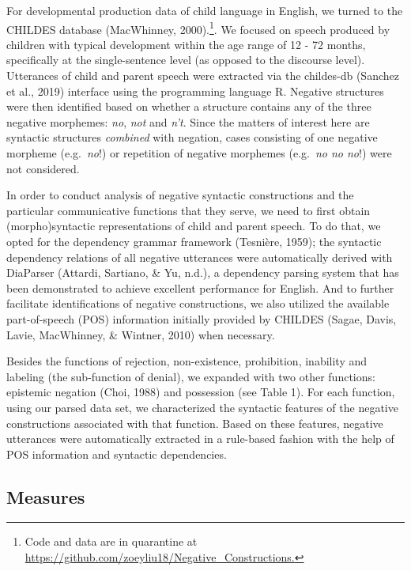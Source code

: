 \documentclass[10pt, letterpaper]{article}
\begin{document}
For developmental production data of child language in English, we
turned to the CHILDES database (MacWhinney,
2000).\footnote{Code and data are in quarantine at \url{https://github.com/zoeyliu18/Negative_Constructions.}}.
We focused on speech produced by children with typical development
within the age range of 12 - 72 months, specifically at the
single-sentence level (as opposed to the discourse level). Utterances of
child and parent speech were extracted via the childes-db (Sanchez et
al., 2019) interface using the programming language R. Negative
structures were then identified based on whether a structure contains
any of the three negative morphemes: \emph{no}, \emph{not} and
\emph{n't}. Since the matters of interest here are syntactic structures
\emph{combined} with negation, cases consisting of one negative morpheme
(e.g.~\emph{no}!) or repetition of negative morphemes (e.g.~\emph{no no
no}!) were not considered.

In order to conduct analysis of negative syntactic constructions and the
particular communicative functions that they serve, we need to first
obtain (morpho)syntactic representations of child and parent speech. To
do that, we opted for the dependency grammar framework (Tesnière, 1959);
the syntactic dependency relations of all negative utterances were
automatically derived with DiaParser (Attardi, Sartiano, \& Yu, n.d.), a
dependency parsing system that has been demonstrated to achieve
excellent performance for English. And to further facilitate
identifications of negative constructions, we also utilized the
available part-of-speech (POS) information initially provided by CHILDES
(Sagae, Davis, Lavie, MacWhinney, \& Wintner, 2010) when necessary.

Besides the functions of rejection, non-existence, prohibition,
inability and labeling (the sub-function of denial), we expanded with
two other functions: epistemic negation (Choi, 1988) and possession (see
Table 1). For each function, using our parsed data set, we characterized
the syntactic features of the negative constructions associated with
that function. Based on these features, negative utterances were
automatically extracted in a rule-based fashion with the help of POS
information and syntactic dependencies.

\hypertarget{measures}{%
\subsection{Measures}\label{measures}}
\end{document}
